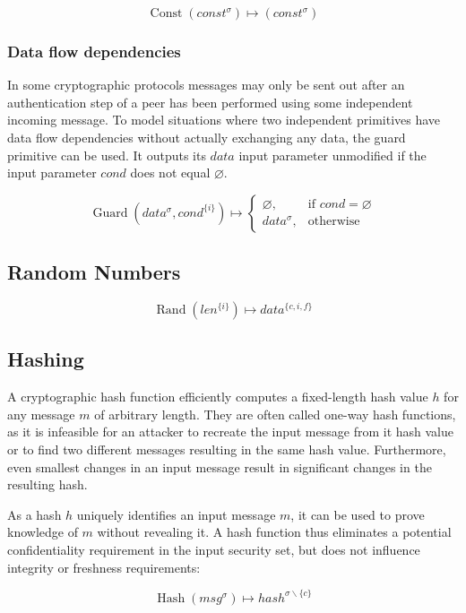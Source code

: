 \documentclass[a4paper]{article}
\DeclareMathOperator{\hash}{Hash}
\DeclareMathOperator{\rand}{Rand}
\DeclareMathOperator{\guard}{Guard}
\DeclareMathOperator{\const}{Const}
\newcommand{\emptysec}{\varnothing}
\newcommand{\secminus}{\smallsetminus}
\begin{document}
$$\const(const^{\sigma}) \mapsto (const^{\sigma})$$

\subsubsection{Data flow dependencies}

In some cryptographic protocols messages may only be sent out after an
authentication step of a peer has been performed using some independent
incoming message. To model situations where two independent primitives have
data flow dependencies without actually exchanging any data, the guard
primitive can be used. It outputs its $data$ input parameter unmodified if the
input parameter $cond$ does not equal $\emptysec$. 

\begin{equation*}
\guard(data^{\sigma}, cond^{\{i\}}) \mapsto
    \begin{cases}
        \emptysec,      & \text{if $cond = \emptysec$} \\
        data^{\sigma},  & \text{otherwise}
    \end{cases}
\end{equation*}

\subsection{Random Numbers}

$$\rand(len^{\{i\}}) \mapsto data^{\{c,i,f\}}$$

\subsection{Hashing}

A cryptographic hash function efficiently computes a fixed-length hash value
$h$ for any message $m$ of arbitrary length. They are often called one-way hash
functions, as it is infeasible for an attacker to recreate the input message
from it hash value or to find two different messages resulting in the same hash
value. Furthermore, even smallest changes in an input message result in
significant changes in the resulting hash.

As a hash $h$ uniquely identifies an input message $m$, it can be used to prove
knowledge of $m$ without revealing it. A hash function thus eliminates a
potential confidentiality requirement in the input security set, but does not
influence integrity or freshness requirements:

$$\hash(msg^\sigma) \mapsto hash^{\sigma\secminus\{c\}}$$
\end{document}
